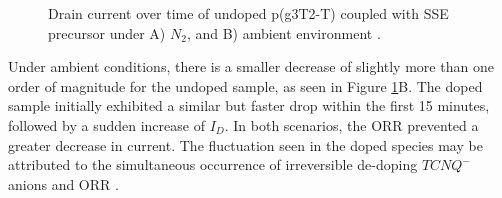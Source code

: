 \begin{figure}[ht]
    \centering
    \caption[Drain current over time of undoped-p(g3T2-T) coupled with SSE precursor]{Drain current over time of undoped p(g3T2-T) coupled with SSE precursor under A) $N_{2}$, and B) ambient environment%
    .}
    \label{fig:revox1}
\end{figure}

Under ambient conditions, there is a smaller decrease of slightly more than one order of magnitude for the undoped sample, as seen in Figure \ref{fig:revox1}B. The doped sample initially exhibited a similar but faster drop within the first 15 minutes, followed by a sudden increase of $I_{D}$. In both scenarios, the ORR prevented a greater decrease in current. The fluctuation seen in the doped species may be attributed to the simultaneous occurrence of irreversible de-doping $TCNQ^{-}$ anions and ORR . %

